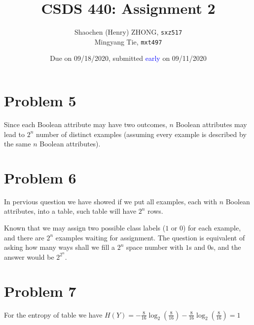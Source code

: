 \documentclass[12pt]{article}
\newcommand{\ilcode}{\texttt}
\begin{document}
\title{\textbf{CSDS 440: Assignment 2}}

\author{Shaochen (Henry) ZHONG, \ilcode{sxz517} \\ Mingyang Tie, \ilcode{mxt497}}
\date{Due on 09/18/2020, submitted \textcolor{blue}{early} on 09/11/2020}
\maketitle


\section{Problem 5}

Since each Boolean attribute may have two outcomes, $n$ Boolean attributes may lead to $2^n$ number of distinct examples (assuming every example is described by the same $n$ Boolean attributes).

\section{Problem 6}

In pervious question we have showed if we put all examples, each with $n$ Boolean attributes, into a table, such table will have $2^n$ rows.

Known that we may assign two possible class labels ($1$ or $0$) for each example, and there are $2^n$ examples waiting for assignment. The question is equivalent of asking how many ways shall we fill a $2^n$ space number with $1$s and $0$s, and the answer would be $2^{2^n}$.

\section{Problem 7}

For the entropy of table we have $H(Y) = -\frac{8}{16} \log_2( \frac{8}{16}) -\frac{8}{16} \log_2( \frac{8}{16}) = 1$
\end{document}
